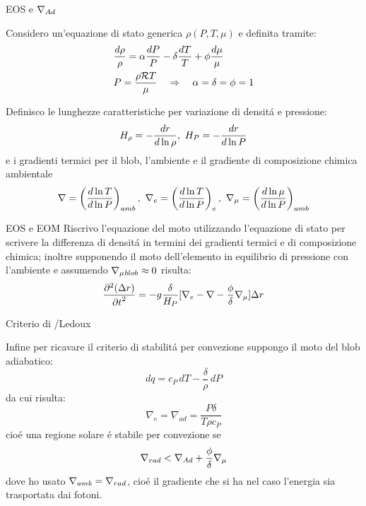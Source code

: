 \begin{wordonframe}{EOS e $\nad{}$}

Considero un'equazione di stato generica $\rho(P,T,\mu)$ e definita tramite:
\begin{align*}
&\frac{d\rho}{\rho}=\alpha\frac{dP}{P}-\delta\frac{dT}{T}+\phi\frac{d\mu}{\mu}\\
&P=\frac{\rho\gasconstant{}T}{\mu}\quad\Rightarrow\quad\alpha=\delta=\phi=1
\end{align*}

Definisco le lunghezze caratteristiche per variazione di densit\'a e pressione:
\begin{equation*}
\densityscale{}=-\frac{dr}{d\ln{\rho}},\ H_P=-\frac{dr}{d\ln{P}}
\end{equation*}
e i gradienti termici per il blob, l'ambiente e il gradiente di composizione chimica ambientale
\begin{equation*}
\nabla=\Dcvar{\TDly{P}{T}}{amb},\ \nabla_e=\Dcvar{\TDly{P}{T}}{e},\ \nmu{}=\Dcvar{\TDly{P}{\mu}}{amb}
\end{equation*}
\end{wordonframe}

\begin{wordonframe}{EOS e EOM}
Riscrivo l'equazione del moto utilizzando l'equazione di stato per scrivere la differenza di densit\'a in termini dei gradienti termici e di composizione chimica; inoltre supponendo il moto dell'elemento in equilibrio di pressione con l'ambiente e assumendo $\nmu{}_{blob}\approx0$ risulta:
\begin{equation*}
\PtwoDy{t}{(\Delta r)}=-g\frac{\delta}{H_P}[\nabla_e-\nabla-\frac{\phi}{\delta}\nmu{}]\Delta r
\end{equation*}

\end{wordonframe}

\begin{wordonframe}{Criterio di \sch/Ledoux}

Infine per ricavare il criterio di stabilit\'a per convezione suppongo  il moto del blob adiabatico:
\begin{equation*}
dq=c_P\,dT-\frac{\delta}{\rho}\,dP
\end{equation*}
da cui risulta:
\begin{equation*}
\nabla_e=\nabla_{ad}=\frac{P\delta}{T\rho c_P}
\end{equation*}
cio\'e una regione solare \'e stabile per convezione se
\begin{equation*}
\nrad{}<\nad+\frac{\phi}{\delta}\nmu{}\label{eq:ledoux}
\end{equation*}
dove ho usato $\nabla_{amb}=\nrad{}$, cio\'e il gradiente che si ha nel caso l'energia sia trasportata dai fotoni.
\end{wordonframe}

